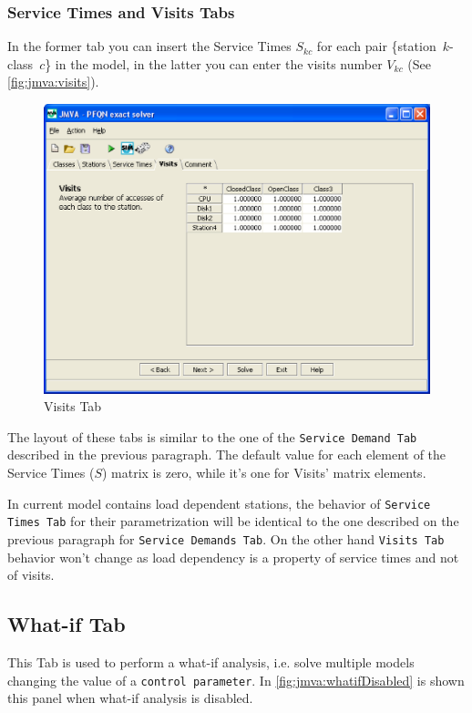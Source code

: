 \subsubsection{Service Times and Visits Tabs}
In the former tab you can insert the Service Times $S_{kc}$ for each
pair \{station~$k$-class~$c$\} in the model, in the latter you can
enter the visits number $V_{kc}$ (See \autoref{fig:jmva:visits}).

\begin{figure}[htbp]
    \begin{center}
        \includegraphics[scale=.5]{img/jmva/visits}
    \end{center}
    \caption{Visits Tab}
    \label{fig:jmva:visits}
\end{figure}

The layout of these tabs is similar to the one of the
\texttt{Service Demand Tab} described in the previous paragraph. The
default value for each element of the Service Times ($S$) matrix is
zero, while it's one for Visits' matrix elements.

In current model contains load dependent stations, the behavior of
\texttt{Service Times Tab} for their parametrization will be
identical to the one described on the previous paragraph for
\texttt{Service Demands Tab}. On the other hand \texttt{Visits Tab}
behavior won't change as load dependency is a property of service
times and not of visits.

\subsection{What-if Tab}
\label{sec:jmva:whatif} This Tab is used to perform a what-if
analysis, i.e. solve multiple models changing the value of a
\texttt{control parameter}. In \autoref{fig:jmva:whatifDisabled} is
shown this panel when what-if analysis is disabled.

